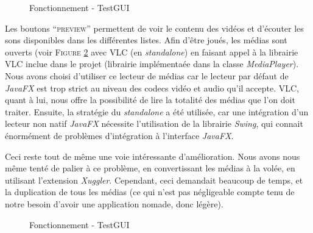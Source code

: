 \begin{figure}[!ht]
\begin{center}
  \caption{Fonctionnement - TestGUI}
  \label{TestGUI}
\end{center}
\end{figure}

Les boutons ``\textsc{preview}'' permettent de voir le contenu des vidéos et d'écouter les sons disponibles dans les différentes listes. Afin d'être joués, les médias sont ouverts (voir \textsc{Figure} \ref{VLC} avec VLC (en \textit{standalone}) en faisant appel à la librairie VLC inclue dans le projet (librairie implémentaée dans la classe \textit{MediaPlayer}). Nous avons choisi d'utiliser ce lecteur de médias car le lecteur par défaut de \textit{JavaFX} est trop strict au niveau des codecs vidéo et audio qu'il accepte. VLC, quant à lui, nous offre la possibilité de lire la totalité des médias que l'on doit traiter. Ensuite, la stratégie du \textit{standalone} a été utilisée, car une intégration d'un lecteur non natif \textit{JavaFX} nécessite l'utilisation de la librairie \textit{Swing}, qui connait énormément de problèmes d'intégration à l'interface \textit{JavaFX}.

Ceci reste tout de même une voie intéressante d'amélioration. Nous avons nous même tenté de palier à ce problème, en convertissant les médias à la volée, en utilisant l'extension \textit{Xuggler}. Cependant, ceci demandait beaucoup de temps, et la duplication de tous les médias (ce qui n'est pas négligeable compte tenu de notre besoin d'avoir une application nomade, donc légère).

\begin{figure}[!ht]
\begin{center}
  \caption{Fonctionnement - TestGUI}
  \label{VLC} 
\end{center}
\end{figure}

